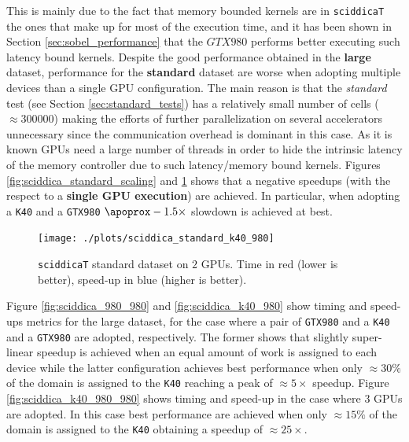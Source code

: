 This is mainly due to the fact that memory bounded kernels are in \texttt{sciddicaT} the ones that make up for most of the execution time, and it has been shown in Section \ref{sec:sobel_performance} that the $GTX980$ performs better executing such latency bound kernels.
Despite the good performance obtained in the \textbf{large} dataset, performance for the \textbf{standard} dataset are worse when adopting multiple devices than a single GPU configuration. The main reason is that the \textit{standard} test (see Section \ref{sec:standard_tests}) has a relatively small number of cells ($\approx 300000$) making the efforts of further parallelization on several accelerators unnecessary since the communication overhead is dominant in this case. As it is known GPUs need a large number of threads in order to hide the intrinsic latency of the memory controller due to such latency/memory bound kernels.
Figures \ref{fig:sciddica_standard_scaling} and \ref{fig:sciddica_standard_980_k40} shows  that a negative speedups (with the respect to a \textbf{single GPU execution}) are achieved. In particular, when adopting a \texttt{K40} and a \texttt{GTX980} $\apoprox -1.5 \times$ slowdown is achieved at best.
\begin{figure}[!htb]
	\centering
	\texttt{[image: ./plots/sciddica\_standard\_k40\_980]}
	\caption{\texttt{sciddicaT} standard dataset on $2$ GPUs. Time in red (lower is better), speed-up in blue (higher is better).}
	\label{fig:sciddica_standard_980_k40}
\end{figure}
Figure \ref{fig:sciddica_980_980} and \ref{fig:sciddica_k40_980} show timing and speed-ups metrics for the large dataset, for the case where a pair of \texttt{GTX980} and a \texttt{K40} and a \texttt{GTX980} are adopted, respectively. The former shows that slightly super-linear speedup is achieved when an equal amount of work is assigned to each device while the latter configuration achieves best performance when only $\approx 30\%$ of the domain is assigned to the \texttt{K40} reaching a peak of $\approx 5 \times$ speedup.
Figure \ref{fig:sciddica_k40_980_980} shows timing and speed-up in the case where $3$ GPUs are adopted. In this case best performance are achieved when only $\approx 15\%$ of the domain is assigned to the \texttt{K40} obtaining a speedup of  $\approx 25 \times$.

